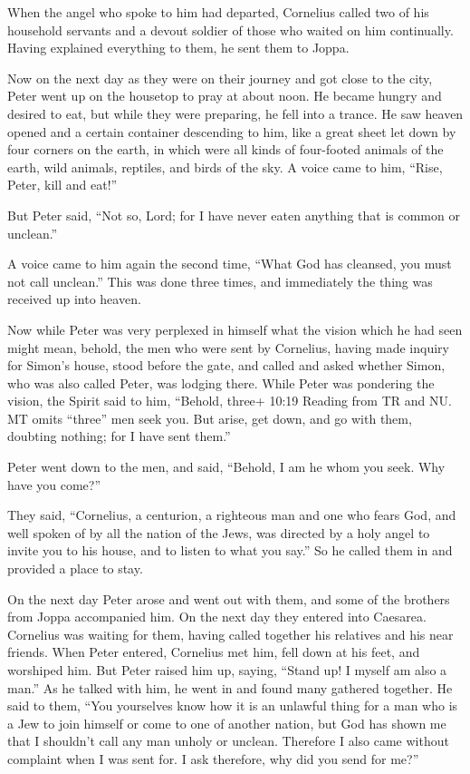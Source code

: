  When the angel who spoke to him had departed, Cornelius
called two of his household servants and a devout soldier of those who
waited on him continually.  Having explained everything to
them, he sent them to Joppa.

 Now on the next day as they were on their journey and got
close to the city, Peter went up on the housetop to pray at about noon.
 He became hungry and desired to eat, but while they were
preparing, he fell into a trance.  He saw heaven opened and
a certain container descending to him, like a great sheet let down by
four corners on the earth,  in which were all kinds of
four-footed animals of the earth, wild animals, reptiles, and birds of
the sky.  A voice came to him, ``Rise, Peter, kill and
eat!''

 But Peter said, ``Not so, Lord; for I have never eaten
anything that is common or unclean.''

 A voice came to him again the second time, ``What God has
cleansed, you must not call unclean.''  This was done three
times, and immediately the thing was received up into heaven.

 Now while Peter was very perplexed in himself what the
vision which he had seen might mean, behold, the men who were sent by
Cornelius, having made inquiry for Simon's house, stood before the gate,
 and called and asked whether Simon, who was also called
Peter, was lodging there.  While Peter was pondering the
vision, the Spirit said to him, ``Behold, three+ 10:19 Reading from TR
and NU. MT omits ``three'' men seek you.  But arise, get
down, and go with them, doubting nothing; for I have sent them.''

 Peter went down to the men, and said, ``Behold, I am he
whom you seek. Why have you come?''

 They said, ``Cornelius, a centurion, a righteous man and
one who fears God, and well spoken of by all the nation of the Jews, was
directed by a holy angel to invite you to his house, and to listen to
what you say.''  So he called them in and provided a place
to stay.

On the next day Peter arose and went out with them, and some of the
brothers from Joppa accompanied him.  On the next day they
entered into Caesarea. Cornelius was waiting for them, having called
together his relatives and his near friends.  When Peter
entered, Cornelius met him, fell down at his feet, and worshiped him.
 But Peter raised him up, saying, ``Stand up! I myself am
also a man.''  As he talked with him, he went in and found
many gathered together.  He said to them, ``You yourselves
know how it is an unlawful thing for a man who is a Jew to join himself
or come to one of another nation, but God has shown me that I shouldn't
call any man unholy or unclean.  Therefore I also came
without complaint when I was sent for. I ask therefore, why did you send
for me?''

